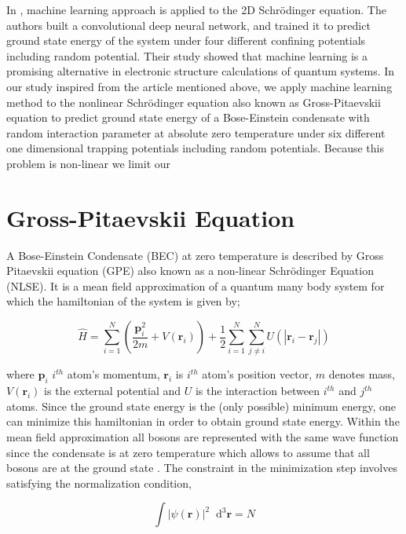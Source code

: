 \documentclass[a4paper,times,hidelinks,12pt]{article}
\newcommand*\dif{\mathop{}\!\mathrm{d}}
\begin{document}
In \cite{mills2017deep}, machine learning approach is applied to the 2D Schr{\"o}dinger equation. The authors built a convolutional deep neural network, and trained it to predict ground state energy of the system under four different confining potentials including random potential. Their study showed that machine learning is a promising alternative in electronic structure calculations of quantum systems. In our study inspired from the article mentioned above, we apply machine learning method to the nonlinear Schr{\"o}dinger equation also known as Gross-Pitaevskii equation to predict ground state energy of a Bose-Einstein condensate with random interaction parameter at absolute zero temperature under six different one dimensional trapping potentials including random potentials. Because this problem is non-linear we limit our 


\section{Gross-Pitaevskii Equation}

A Bose-Einstein Condensate (BEC) at zero temperature is described by Gross Pitaevskii equation (GPE) also known as a non-linear Schr\"{o}dinger Equation (NLSE). It is a mean field approximation of a quantum many body system for which the hamiltonian of the system is given by;

\begin{equation}
\label{eq:GPE_hamiltonian}
\hat{H} = \sum_{i = 1}^{N} \left(\frac{\boldsymbol{p}_i^2}{2m} + V(\boldsymbol{r}_i) \right) + \frac{1}{2} \sum_{i = 1}^{N} \sum_{j \neq i}^{N} U(|\boldsymbol{r}_i - \boldsymbol{r}_j|)
\end{equation}

\noindent where $\boldsymbol{p}_i$ $i^{th}$ atom's momentum, $\boldsymbol{r}_i$ is $i^{th}$ atom's position vector, $m$ denotes mass, $V(\boldsymbol{r}_i)$ is the external potential and $U$ is the interaction between $i^{th}$ and $j^{th}$  atoms. Since the ground state energy is the (only possible) minimum energy, one can minimize this hamiltonian in order to obtain ground state energy. Within the mean field approximation all bosons are represented with the same wave function since the condensate is at zero temperature which allows to assume that all bosons are at the ground state \cite{pethick2002bose}. The constraint in the minimization step involves satisfying the normalization condition,


\begin{equation}
\label{eq:GPE_normalization}
\int |\psi(\boldsymbol{r})|^2 \dif^3 \boldsymbol{r} = N    
\end{equation}
\end{document}
